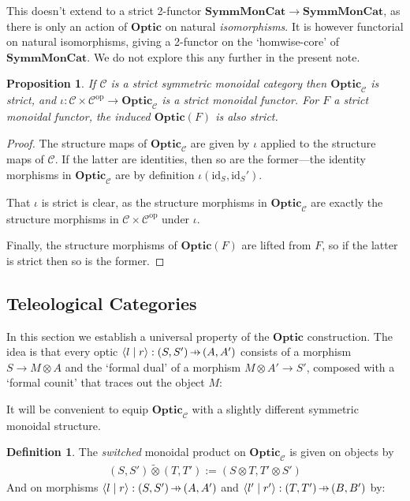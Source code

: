 \documentclass[11pt,letterpaper]{article}
\theoremstyle{plain}
\newtheorem{proposition}[theorem]{Proposition}
\theoremstyle{definition}
\newtheorem{definition}[theorem]{Definition}
\newcommand{\C}{\mathscr{C}}
\newcommand{\SymmMonCat}{\mathbf{SymmMonCat}}
\newcommand{\Optic}{\mathbf{Optic}}
\newcommand{\switched}{\mathbin{\tilde{\otimes}}}
\newcommand{\id}{\mathrm{id}}
\newcommand{\op}{\mathrm{op}}
\newcommand{\rep}[2]{{\ensuremath \left\langle #1 \mid #2 \right\rangle}}
\newcommand{\hto}{\ensuremath{\,\mathaccent\shortmid\rightarrow\,}}
\begin{document}
This doesn't extend to a strict 2-functor $\SymmMonCat \to \SymmMonCat$, as there is only an action of $\Optic$ on natural \emph{isomorphisms}. It is however functorial on natural isomorphisms, giving a 2-functor on the `homwise-core' of $\SymmMonCat$. We do not explore this any further in the present note.

\begin{proposition}
  If $\C$ is a strict symmetric monoidal category then $\Optic_\C$ is strict, and $\iota : \C \times \C^\op \to \Optic_\C$ is a strict monoidal functor. For $F$ a strict monoidal functor, the induced $\Optic(F)$ is also strict.
\end{proposition}
\begin{proof}
  The structure maps of $\Optic_\C$ are given by $\iota$ applied to the structure maps of $\C$. If the latter are identities, then so are the former---the identity morphisms in $\Optic_\C$ are by definition $\iota(\id_S, \id_S')$.

  That $\iota$ is strict is clear, as the structure morphisms in $\Optic_\C$ are exactly the structure morphisms in $\C \times \C^\op$ under $\iota$. 
  
  Finally, the structure morphisms of $\Optic(F)$ are lifted from $F$, so if the latter is strict then so is the former.
\end{proof}

\subsection{Teleological Categories}\label{sec:teleological-categories}
In this section we establish a universal property of the $\Optic$ construction. The idea is that every optic $\rep{l}{r} : (S, S') \hto (A, A')$ consists of a morphism $S \to M \otimes A$ and the `formal dual' of a morphism $M \otimes A' \to S'$, composed with a `formal counit' that traces out the object $M$:
\begin{center}
  
\end{center}

It will be convenient to equip $\Optic_\C$ with a slightly different symmetric monoidal structure.

\begin{definition}
  The \emph{switched} monoidal product on $\Optic_\C$ is given on objects by
  \begin{align*}
    (S, S') \switched (T, T') := (S \otimes T, T' \otimes S')
  \end{align*}
  And on morphisms $\rep{l}{r} : (S, S') \hto (A, A')$ and $\rep{l'}{r'} : (T, T') \hto (B, B')$ by:
  \begin{center}
    
  \end{center}
\end{definition}
\end{document}
